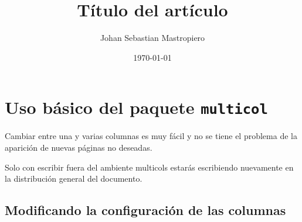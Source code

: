 \documentclass{article}
\title{Título del artículo}
\author{Johan Sebastian Mastropiero}
\date{\today}
\begin{document}
	\maketitle
	\begin{abstract}
		\lipsum[1]
	\end{abstract}
	
	\section{Uso básico del paquete \texttt{multicol}}
		Cambiar entre una y varias columnas es muy fácil y no se tiene el problema de la aparición de nuevas páginas no deseadas. 
		\begin{multicols}{2}
			\lipsum[7-9]
		\end{multicols}	
	
	Solo con escribir fuera del ambiente multicols estarás escribiendo nuevamente en la distribución general del documento.
	\lipsum[1-2]
	
	\subsection{Modificando la configuración de las columnas}
	\renewcommand{\columnseprule}{1pt} %
	\setlength\columnsep{3mm} %
	\begin{multicols}{3}
		\lipsum[1-2]
	\end{multicols}
\end{document}
